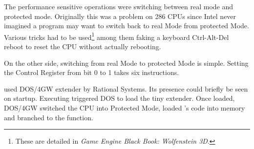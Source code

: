 The performance sensitive operations were switching between real mode and protected mode. Originally this was a problem on 286 CPUs since Intel never imagined a program may want to switch back to real Mode from protected Mode. Various tricks had to be used\footnote{These are detailed in \textit{Game Engine Black Book: Wolfenstein 3D}.} among them faking a keyboard Ctrl-Alt-Del reboot to reset the CPU without actually rebooting.\\
\par
On the other side, switching from real Mode to protected Mode is simple. Setting the Control Register from bit 0 to 1 takes six instructions.\\
\par
{}
\par

\doom{} used DOS/4GW extender by Rational Systems. Its presence could briefly be seen on startup. Executing  triggered DOS to load the tiny extender. Once loaded, DOS/4GW switched the CPU into Protected Mode, loaded \doom's code into memory and branched to the  function.\\
\par
{}





